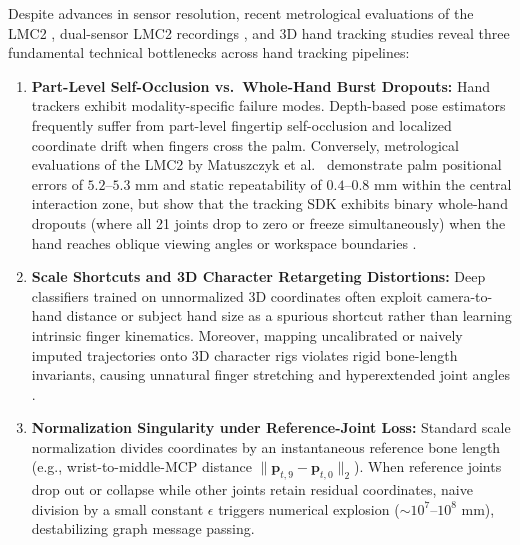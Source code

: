 \documentclass[10pt,twocolumn]{article}
\begin{document}
Despite advances in sensor resolution, recent metrological evaluations of the LMC2 \cite{matuszczyk2025comparative}, dual-sensor LMC2 recordings \cite{gilmartin2024dual}, and 3D hand tracking studies \cite{boulahia2017dynamic,chen2018nonparametric,chen2020construct} reveal three fundamental technical bottlenecks across hand tracking pipelines:
\begin{enumerate}
    \item \textbf{Part-Level Self-Occlusion vs.\ Whole-Hand Burst Dropouts:} Hand trackers exhibit modality-specific failure modes. Depth-based pose estimators \cite{desmedt2017shrec,chen2018nonparametric} frequently suffer from part-level fingertip self-occlusion and localized coordinate drift when fingers cross the palm. Conversely, metrological evaluations of the LMC2 by Matuszczyk et al.\ \cite{matuszczyk2025comparative} demonstrate palm positional errors of $5.2\text{--}5.3\text{ mm}$ and static repeatability of $0.4\text{--}0.8\text{ mm}$ within the central interaction zone, but show that the tracking SDK exhibits binary whole-hand dropouts (where all 21 joints drop to zero or freeze simultaneously) when the hand reaches oblique viewing angles or workspace boundaries \cite{boulahia2017dynamic,matuszczyk2025comparative}.
    \item \textbf{Scale Shortcuts and 3D Character Retargeting Distortions:} Deep classifiers trained on unnormalized 3D coordinates often exploit camera-to-hand distance or subject hand size as a spurious shortcut rather than learning intrinsic finger kinematics. Moreover, mapping uncalibrated or naively imputed trajectories onto 3D character rigs violates rigid bone-length invariants, causing unnatural finger stretching and hyperextended joint angles \cite{noiumkar2013use,chen2018nonparametric}.
    \item \textbf{Normalization Singularity under Reference-Joint Loss:} Standard scale normalization divides coordinates by an instantaneous reference bone length (e.g., wrist-to-middle-MCP distance $\|\mathbf{p}_{t,9}-\mathbf{p}_{t,0}\|_2$). When reference joints drop out or collapse while other joints retain residual coordinates, naive division by a small constant $\epsilon$ triggers numerical explosion ($\sim 10^7\text{--}10^8\text{ mm}$), destabilizing graph message passing.
\end{enumerate}
\end{document}

